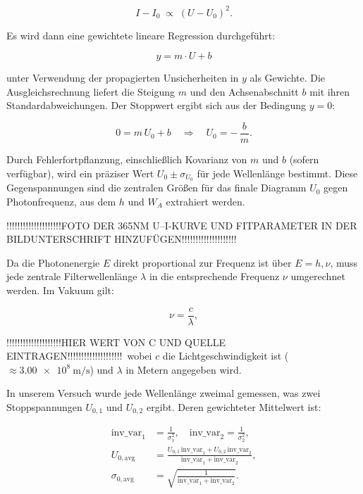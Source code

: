 \begin{equation}
  I - I_{0} \;\propto\;(U - U_{0})^{2}.
\end{equation}

Es wird dann eine gewichtete lineare Regression durchgeführt:

\begin{equation}
    y = m \cdot U + b
\end{equation}

unter Verwendung der propagierten Unsicherheiten in $y$ als Gewichte. Die Ausgleichsrechnung liefert die Steigung $m$ und den Achsenabschnitt $b$ mit ihren Standardabweichungen. Der Stoppwert ergibt sich aus der Bedingung $y=0$:

\begin{equation}
  0 = m\,U_{0} + b
  \quad\Longrightarrow\quad
  U_{0} = -\,\frac{b}{m}.
\end{equation}

Durch Fehlerfortpflanzung, einschließlich Kovarianz von $m$ und $b$ (sofern verfügbar), wird ein präziser Wert $U_{0}\pm\sigma_{U_{0}}$ für jede Wellenlänge bestimmt. Diese Gegenspannungen sind die zentralen Größen für das finale Diagramm $U_{0}$ gegen Photonfrequenz, aus dem $h$ und $W_{A}$ extrahiert werden.

!!!!!!!!!!!!!!!!!!!!FOTO DER 365NM U–I-KURVE UND FITPARAMETER IN DER BILDUNTERSCHRIFT HINZUFÜGEN!!!!!!!!!!!!!!!!!!!!

Da die Photonenergie $E$ direkt proportional zur Frequenz ist über $E = h,\nu$, muss jede zentrale Filterwellenlänge $\lambda$ in die entsprechende Frequenz $\nu$ umgerechnet werden. Im Vakuum gilt:

\begin{equation}
    \nu = \frac{c}{\lambda},
\end{equation}

!!!!!!!!!!!!!!!!!!!!HIER WERT VON C UND QUELLE EINTRAGEN!!!!!!!!!!!!!!!!!!!!\
wobei $c$ die Lichtgeschwindigkeit ist ($\approx\SI{3.00e8}{\metre\per\second}$) und $\lambda$ in Metern angegeben wird.

In unserem Versuch wurde jede Wellenlänge zweimal gemessen, was zwei Stoppspannungen $U_{0,1}$ und $U_{0,2}$ ergibt. Deren gewichteter Mittelwert ist:

\begin{equation}
  \begin{aligned}
    \mathrm{inv\_var}_1 &= \frac{1}{\sigma_{1}^{2}},\quad
    \mathrm{inv\_var}_2 = \frac{1}{\sigma_{2}^{2}},\\[1ex]
    U_{0,\mathrm{avg}}  &= \frac{U_{0,1}\,\mathrm{inv\_var}_1 + U_{0,2}\,\mathrm{inv\_var}_2}
                               {\mathrm{inv\_var}_1 + \mathrm{inv\_var}_2},\\[1ex]
    \sigma_{0,\mathrm{avg}} &= \sqrt{\frac{1}{\mathrm{inv\_var}_1 + \mathrm{inv\_var}_2}}.
  \end{aligned}
\end{equation}

